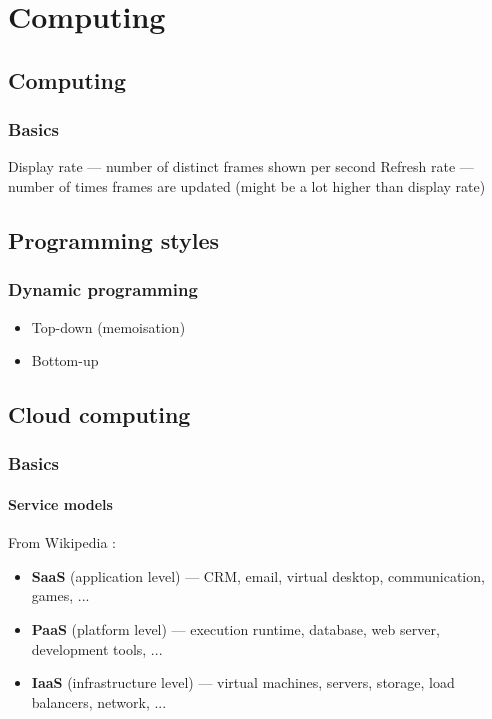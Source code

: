 \chapter{Computing}

\section{Computing}

\subsection{Basics}

\begin{itemize}
Display rate --- number of distinct frames shown per second
Refresh rate --- number of times frames are updated (might be a lot higher than display rate)
\end{itemize}


\section{Programming styles}
\subsection{Dynamic programming}
\begin{itemize}
	\item Top-down (memoisation)
	\item Bottom-up
\end{itemize}

\section{Cloud computing}

\subsection{Basics}

\subsubsection{Service models}

From Wikipedia \cite{wikipedia_cloud_computing}:
\begin{itemize}
	\item \textbf{SaaS} (application level) --- CRM, email, virtual desktop, communication, games, ...
	\item \textbf{PaaS} (platform level) --- execution runtime, database, web server, development tools, ...
	\item \textbf{IaaS} (infrastructure level) --- virtual machines, servers, storage, load balancers, network, ...
\end{itemize}
